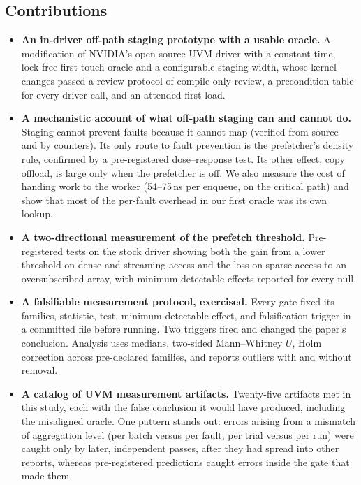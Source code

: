 \subsection{Contributions}

\begin{itemize}
  \item \textbf{An in-driver off-path staging prototype with a usable oracle.}
  A modification of NVIDIA's open-source UVM driver with a constant-time,
  lock-free first-touch oracle and a configurable staging width, whose kernel
  changes passed a review protocol of compile-only review, a precondition table
  for every driver call, and an attended first load.

  \item \textbf{A mechanistic account of what off-path staging can and cannot
  do.} Staging cannot prevent faults because it cannot map (verified from
  source and by counters). Its only route to fault prevention is the
  prefetcher's density rule, confirmed by a pre-registered dose--response
  test. Its other effect, copy offload, is large only when the prefetcher is
  off. We also measure the cost of handing work to the worker
  (54--75\,ns per enqueue, on the critical path) and show that most of the
  per-fault overhead in our first oracle was its own lookup.

  \item \textbf{A two-directional measurement of the prefetch threshold.}
  Pre-registered tests on the stock driver showing both the gain from a lower
  threshold on dense and streaming access and the loss on sparse access to an
  oversubscribed array, with minimum detectable effects reported for every
  null.

  \item \textbf{A falsifiable measurement protocol, exercised.} Every gate fixed
  its families, statistic, test, minimum detectable effect, and falsification
  trigger in a committed file before running. Two triggers fired and changed the
  paper's conclusion. Analysis uses medians, two-sided Mann--Whitney $U$, Holm
  correction across pre-declared families, and reports outliers with and
  without removal.

  \item \textbf{A catalog of UVM measurement artifacts.} Twenty-five artifacts
  met in this study, each with the false conclusion it would have produced,
  including the misaligned oracle. One pattern stands out: errors arising from
  a mismatch of aggregation level (per batch versus per fault, per trial versus
  per run) were caught only by later, independent passes, after they had spread
  into other reports, whereas pre-registered predictions caught errors inside the
  gate that made them.
\end{itemize}

